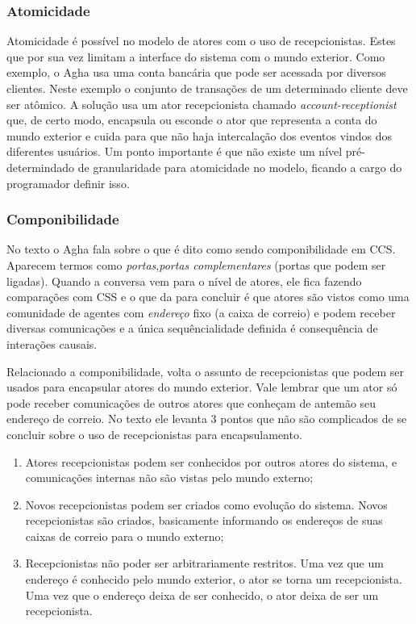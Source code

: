 \documentclass[]{article}
\begin{document}
		\subsubsection{Atomicidade}
		\par Atomicidade é possível no modelo de atores com o uso de recepcionistas. Estes que por sua vez
		limitam a interface do sistema com o mundo exterior. Como exemplo, o Agha usa uma conta bancária que
		pode ser acessada por diversos clientes. Neste exemplo o conjunto de transações de um determinado cliente
		deve ser atômico. A solução usa um ator recepcionista chamado \textit{account-receptionist} que, de certo
		modo, encapsula ou esconde o ator que representa a conta do mundo exterior e cuida para que não haja 
		intercalação dos eventos vindos dos diferentes usuários. Um ponto importante é que não existe um nível
		pré-determindado de granularidade para atomicidade no modelo, ficando a cargo do programador definir isso.
		
		\subsubsection{Componibilidade}
		\par No texto o Agha fala sobre o que é dito como sendo componibilidade em CCS. Aparecem termos como
		\emph{portas},\emph{portas complementares} (portas que podem ser ligadas). Quando a conversa vem para
		o nível de atores, ele fica fazendo comparações com CSS e o que da para concluir é que atores são vistos
		como uma comunidade de agentes com \emph{endereço} fixo (a caixa de correio) e podem receber diversas 
		comunicações e a única sequêncialidade definida é consequência de interações causais.
		
		\par Relacionado a componibilidade, volta o assunto de recepcionistas que podem ser usados para encapsular
		atores do mundo exterior. Vale lembrar que um ator só pode receber comunicações de outros atores que 
		conheçam de antemão seu endereço de correio. No texto ele levanta 3 pontos que não são complicados de se
		concluir sobre o uso de recepcionistas para encapsulamento.
		\begin{enumerate}
			\item Atores recepcionistas podem ser conhecidos por outros atores do sistema, e comunicações internas
			não são vistas pelo mundo externo;
			\item Novos recepcionistas podem ser criados como evolução do sistema. Novos recepcionistas são criados,
			basicamente informando os endereços de suas caixas de correio para o mundo externo;
			\item  Recepcionistas não poder ser arbitrariamente restritos. Uma vez que um endereço é conhecido pelo
			mundo exterior, o ator se torna um recepcionista. Uma vez que o endereço deixa de ser conhecido, o ator
			deixa de ser um recepcionista.
		\end{enumerate}
		
\end{document}
